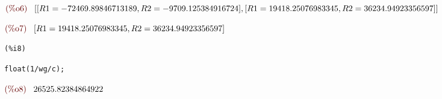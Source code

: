 \documentclass{article}
\begin{document}
\begin{math}\displaystyle
\parbox{8ex}{\color{labelcolor}(\%o6) }
[[R1=-72469.89846713189,R2=-9709.125384916724],[R1=19418.25076983345,R2=36234.94923356597]]
\end{math}

\begin{math}\displaystyle
\parbox{8ex}{\color{labelcolor}(\%o7) }
[R1=19418.25076983345,R2=36234.94923356597]
\end{math}


\noindent
\begin{minipage}[t]{8ex}{\color{red}\bf
\begin{verbatim}
(%i8) 
\end{verbatim}}
\end{minipage}
\begin{minipage}[t]{\textwidth}{\color{blue}
\begin{verbatim}
float(1/wg/c);
\end{verbatim}}
\end{minipage}
\begin{math}\displaystyle
\parbox{8ex}{\color{labelcolor}(\%o8) }
26525.82384864922
\end{math}
\end{document}
